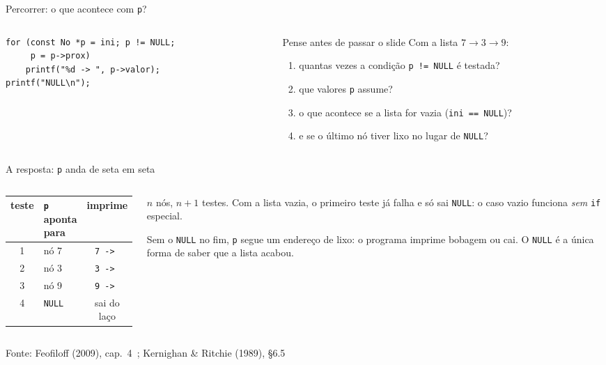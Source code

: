 \documentclass[aspectratio=169]{beamer}
\newcommand{\fonte}[1]{\vfill\hfill{\scriptsize\textcolor{UFSGray}{Fonte: #1}}}
\begin{document}
\begin{frame}[fragile]{Percorrer: o que acontece com \texttt{p}?}
  \begin{columns}[c]
    \begin{column}{0.5\textwidth}
\begin{lstlisting}[style=tinyC]
for (const No *p = ini; p != NULL;
     p = p->prox)
    printf("%d -> ", p->valor);
printf("NULL\n");
\end{lstlisting}
    \end{column}
    \begin{column}{0.46\textwidth}
      \begin{block}{Pense antes de passar o slide}
        \small Com a lista $7 \to 3 \to 9$:
        \begin{enumerate}
          \item quantas vezes a condição \texttt{p != NULL} é testada?
          \item que valores \texttt{p} assume?
          \item o que acontece se a lista for vazia (\texttt{ini == NULL})?
          \item e se o último nó tiver lixo no lugar de \texttt{NULL}?
        \end{enumerate}
      \end{block}
    \end{column}
  \end{columns}
\end{frame}

\begin{frame}{A resposta: \texttt{p} anda de seta em seta}
  \begin{columns}[c]
    \begin{column}{0.48\textwidth}
      \begin{center}
      \small
      \begin{tabular}{@{}clc@{}}
        \toprule
        teste & \texttt{p} aponta para & imprime\\
        \midrule
        1 & nó 7 & \texttt{7 -> }\\
        2 & nó 3 & \texttt{3 -> }\\
        3 & nó 9 & \texttt{9 -> }\\
        4 & \texttt{NULL} & sai do laço\\
        \bottomrule
      \end{tabular}
      \end{center}
    \end{column}
    \begin{column}{0.48\textwidth}
      \small
      $n$ nós, $n+1$ testes. Com a lista vazia, o primeiro teste já falha
      e só sai \texttt{NULL}: o caso vazio funciona \emph{sem} \texttt{if}
      especial.

      \medskip
      Sem o \texttt{NULL} no fim, \texttt{p} segue um endereço de lixo:
      o programa imprime bobagem ou cai. O \texttt{NULL} é a única forma de
      saber que a lista acabou.
    \end{column}
  \end{columns}
  \fonte{Feofiloff (2009), cap.~4~\cite{feofiloff2009algoritmos};
    Kernighan \& Ritchie (1989), §6.5~\cite{kernighan1989c}}
\end{frame}
\end{document}
